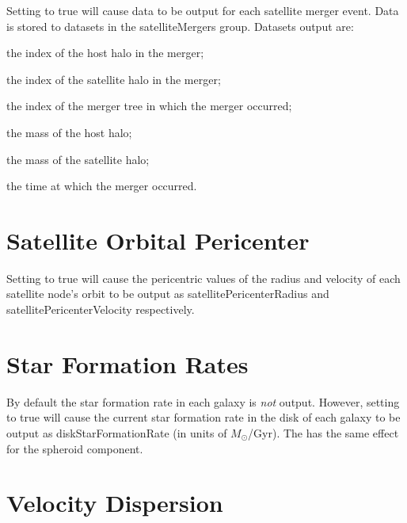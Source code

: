 Setting {\normalfont \ttfamily [outputSatelliteMergers]} to {\normalfont \ttfamily true} will cause data to be output for each satellite merger event. Data is stored to datasets in the {\normalfont \ttfamily satelliteMergers} group. Datasets output are:
\begin{description}
\item{\normalfont \ttfamily [indexHost]} the index of the host halo in the merger;
\item{\normalfont \ttfamily [indexSatellite]} the index of the satellite halo in the merger;
\item{\normalfont \ttfamily [indexTree]} the index of the merger tree in which the merger occurred;
\item{\normalfont \ttfamily [massHost]} the mass of the host halo;
\item{\normalfont \ttfamily [massSatellite]} the mass of the satellite halo;
\item{\normalfont \ttfamily [time]} the time at which the merger occurred.
\end{description}

\section{Satellite Orbital Pericenter}

Setting {\normalfont \ttfamily [outputSatellitePericenterData]} to {\normalfont \ttfamily true} will cause the pericentric values of the radius and velocity of each satellite node's orbit to be output as {\normalfont \ttfamily satellitePericenterRadius} and {\normalfont \ttfamily satellitePericenterVelocity} respectively.

\section{Star Formation Rates}

By default the star formation rate in each galaxy is \emph{not} output. However, setting {\normalfont \ttfamily [diskOutputStarFormationRate]} to true will cause the current star formation rate in the disk of each galaxy to be output as {\normalfont \ttfamily diskStarFormationRate} (in units of $M_\odot$/Gyr). The {\normalfont \ttfamily [spheroidOutputStarFormationRate]} has the same effect for the spheroid component.

\section{Velocity Dispersion}

